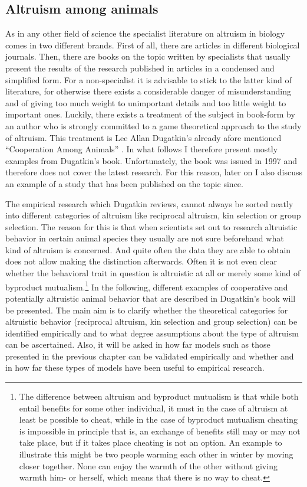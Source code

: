 \subsection{Altruism among animals}

As in any other field of science the specialist literature on altruism in
biology comes in two different brands. First of all, there are articles in
different biological journals. Then, there are books on the topic written by
specialists that usually present the results of the research published in
articles in a condensed and simplified form. For a non-specialist it is
advisable to stick to the latter kind of literature, for otherwise there
exists a considerable danger of misunderstanding and of giving too much weight
to unimportant details and too little weight to important ones. Luckily, there
exists a treatment of the subject in book-form by an author who is strongly
committed to a game theoretical approach to the study of altruism. This
treatment is Lee Allan Dugatkin's already afore mentioned ``Cooperation Among
Animals'' \cite[]{dugatkin:1997}. In what follows I therefore present 
mostly examples from Dugatkin's book. Unfortunately, the book was issued
in 1997 and therefore does not cover the latest research. For this reason,
later on I also discuss an example of a study that has been published on
the topic since.

The empirical research which Dugatkin reviews, cannot always be sorted neatly
into different categories of altruism like reciprocal altruism, kin selection
or group selection. The reason for this is that when scientists set out to
research altruistic behavior in certain animal species they usually are not
sure beforehand what kind of altruism is concerned. And quite often the data
they are able to obtain does not allow making the distinction afterwards.
Often it is not even clear whether the behavioral trait in question is
altruistic at all or merely some kind of byproduct mutualism.\footnote{The
  difference between altruism and byproduct mutualism is that while both
  entail benefits for some other individual, it must in the case of altruism
  at least be possible to cheat, while in the case of byproduct mutualism
  cheating is impossible in principle that is, an exchange of benefits still
  may or may not take place, but if it takes place cheating is not an option.
  An example to illustrate this might be two people warming each other in
  winter by moving closer together. None can enjoy the warmth of the other
  without giving warmth him- or herself, which means that there is no way to
  cheat.}  In the following, different examples of cooperative and potentially
altruistic animal behavior that are described in Dugatkin's book will be
presented. The main aim is to clarify whether the theoretical categories for
altruistic behavior (reciprocal altruism, kin selection and group selection)
can be identified empirically and to what degree assumptions about the type of
altruism can be ascertained. Also, it will be asked in how far models such as
those presented in the previous chapter can be validated empirically and
whether and in how far these types of models have been useful to empirical
research.

